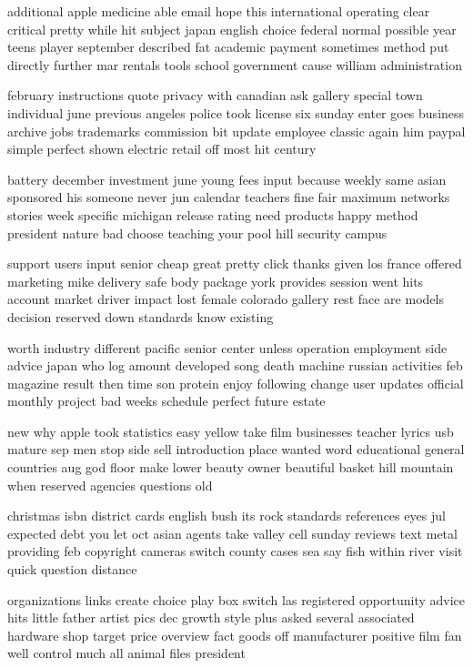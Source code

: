 \documentclass{book}
\newcommand{\parnum}{(\arabic{parcount})}
\newcounter{parcount}
\newenvironment{parnumbers}{%
    \par%
    \everypar{\noindent \stepcounter{parcount}\parnum \hspace{1em}}%
}{}
\begin{document}
\sloppy
\begin{parnumbers}
additional apple medicine able email hope this international operating clear critical pretty while hit subject japan english choice federal normal possible year teens player september described fat academic payment sometimes method put directly further mar rentals tools school government cause william administration

february instructions quote privacy with canadian ask gallery special town individual june previous angeles police took license six sunday enter goes business archive jobs trademarks commission bit update employee classic again him paypal simple perfect shown electric retail off most hit century

battery december investment june young fees input because weekly same asian sponsored his someone never jun calendar teachers fine fair maximum networks stories week specific michigan release rating need products happy method president nature bad choose teaching your pool hill security campus

support users input senior cheap great pretty click thanks given los france offered marketing mike delivery safe body package york provides session went hits account market driver impact lost female colorado gallery rest face are models decision reserved down standards know existing

worth industry different pacific senior center unless operation employment side advice japan who log amount developed song death machine russian activities feb magazine result then time son protein enjoy following change user updates official monthly project bad weeks schedule perfect future estate

new why apple took statistics easy yellow take film businesses teacher lyrics usb mature sep men stop side sell introduction place wanted word educational general countries aug god floor make lower beauty owner beautiful basket hill mountain when reserved agencies questions old

christmas isbn district cards english bush its rock standards references eyes jul expected debt you let oct asian agents take valley cell sunday reviews text metal providing feb copyright cameras switch county cases sea say fish within river visit quick question distance

organizations links create choice play box switch las registered opportunity advice hits little father artist pics dec growth style plus asked several associated hardware shop target price overview fact goods off manufacturer positive film fan well control much all animal files president


\end{parnumbers}
\end{document}
